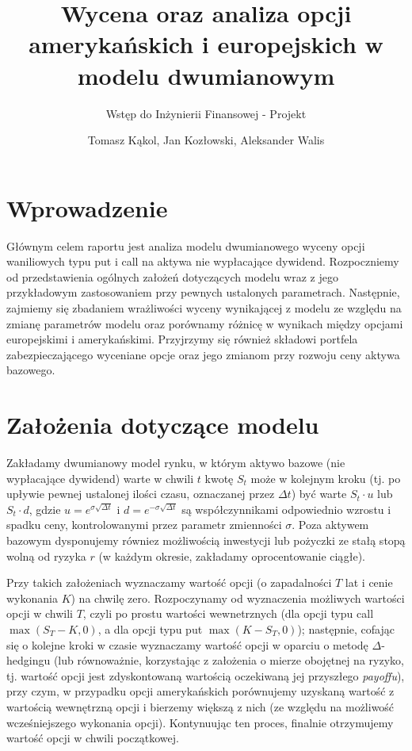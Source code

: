 \documentclass[
]{article}
\title{Wycena oraz analiza opcji amerykańskich i europejskich w modelu
dwumianowym}
\subtitle{Wstęp do Inżynierii Finansowej - Projekt}
\author{Tomasz Kąkol, Jan Kozłowski, Aleksander Walis}
\date{}
\begin{document}
\maketitle

\renewcommand*\contentsname{Spis treści}
{
\hypersetup{linkcolor=}
\setcounter{tocdepth}{2}
\tableofcontents
}
\newpage

\hypertarget{wprowadzenie}{%
\section{Wprowadzenie}\label{wprowadzenie}}

Głównym celem raportu jest analiza modelu dwumianowego wyceny opcji
waniliowych typu put i call na aktywa nie wypłacające dywidend.
Rozpoczniemy od przedstawienia ogólnych założeń dotyczących modelu wraz
z jego przykładowym zastosowaniem przy pewnych ustalonych parametrach.
Następnie, zajmiemy się zbadaniem wrażliwości wyceny wynikającej z
modelu ze względu na zmianę parametrów modelu oraz porównamy różnicę w
wynikach między opcjami europejskimi i amerykańskimi. Przyjrzymy się
również składowi portfela zabezpieczającego wyceniane opcje oraz jego
zmianom przy rozwoju ceny aktywa bazowego.

\hypertarget{zaux142oux17cenia-dotyczux105ce-modelu}{%
\section{Założenia dotyczące
modelu}\label{zaux142oux17cenia-dotyczux105ce-modelu}}

Zakładamy dwumianowy model rynku, w którym aktywo bazowe (nie
wypłacające dywidend) warte w chwili \(t\) kwotę \(S_t\) może w kolejnym
kroku (tj. po upływie pewnej ustalonej ilości czasu, oznaczanej przez
\(\Delta t\)) być warte \(S_t \cdot u\) lub \(S_t \cdot d\), gdzie
\(u = e^{\sigma \sqrt{\Delta t}}\) i \(d = e^{-\sigma \sqrt{\Delta t}}\)
są współczynnikami odpowiednio wzrostu i spadku ceny, kontrolowanymi
przez parametr zmienności \(\sigma\). Poza aktywem bazowym dysponujemy
równiez możliwością inwestycji lub pożyczki ze stałą stopą wolną od
ryzyka \(r\) (w każdym okresie, zakładamy oprocentowanie ciągłe).

Przy takich założeniach wyznaczamy wartość opcji (o zapadalności \(T\)
lat i cenie wykonania \(K\)) na chwilę zero. Rozpoczynamy od wyznaczenia
możliwych wartości opcji w chwili \(T\), czyli po prostu wartości
wewnetrznych (dla opcji typu call \(\max (S_T - K, 0)\), a dla opcji
typu put \(\max (K - S_T, 0)\)); następnie, cofając się o kolejne kroki
w czasie wyznaczamy wartość opcji w oparciu o metodę \(\Delta\)-hedgingu
(lub równoważnie, korzystając z założenia o mierze obojętnej na ryzyko,
tj. wartość opcji jest zdyskontowaną wartością oczekiwaną jej przyszłego
\emph{payoffu}), przy czym, w przypadku opcji amerykańskich porównujemy
uzyskaną wartość z wartością wewnętrzną opcji i bierzemy większą z nich
(ze względu na możliwość wcześniejszego wykonania opcji). Kontynuując
ten proces, finalnie otrzymujemy wartość opcji w chwili początkowej.
\end{document}
